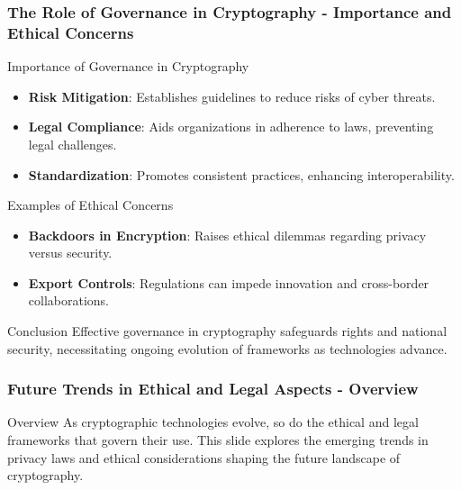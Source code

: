 \documentclass{beamer}
\begin{document}
\begin{frame}[fragile]
    \frametitle{The Role of Governance in Cryptography - Importance and Ethical Concerns}
    \begin{block}{Importance of Governance in Cryptography}
        \begin{itemize}
            \item \textbf{Risk Mitigation}: Establishes guidelines to reduce risks of cyber threats.
            \item \textbf{Legal Compliance}: Aids organizations in adherence to laws, preventing legal challenges.
            \item \textbf{Standardization}: Promotes consistent practices, enhancing interoperability.
        \end{itemize}
    \end{block}

    \begin{block}{Examples of Ethical Concerns}
        \begin{itemize}
            \item \textbf{Backdoors in Encryption}: Raises ethical dilemmas regarding privacy versus security.
            \item \textbf{Export Controls}: Regulations can impede innovation and cross-border collaborations.
        \end{itemize}
    \end{block}

    \begin{block}{Conclusion}
        Effective governance in cryptography safeguards rights and national security, necessitating ongoing evolution of frameworks as technologies advance.
    \end{block}
\end{frame}

\begin{frame}[fragile]
  \frametitle{Future Trends in Ethical and Legal Aspects - Overview}
  \begin{block}{Overview}
    As cryptographic technologies evolve, so do the ethical and legal frameworks that govern their use. This slide explores the emerging trends in privacy laws and ethical considerations shaping the future landscape of cryptography.
  \end{block}
\end{frame}
\end{document}
